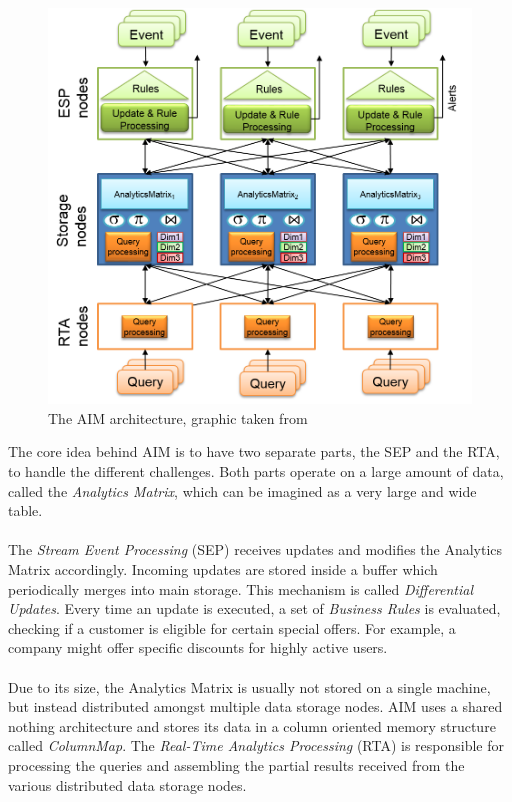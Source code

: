 \documentclass[11pt,singlecolumn]{scrartcl}
\begin{document}
\begin{figure}[h]
\includegraphics[scale=0.7]{layers.png}
\caption{The AIM architecture, graphic taken from \cite{aim}}
\end{figure}
\vspace{10mm}
The core idea behind AIM is to have two separate parts, the SEP and the RTA, to handle the different challenges.  Both parts operate on a large amount of data, called the \textit{Analytics Matrix}, which can be imagined as a very large and wide table. \\\\The \textit{Stream Event Processing} (SEP)  receives updates and modifies the Analytics Matrix accordingly. Incoming updates are stored inside a buffer which periodically merges into main storage. This mechanism is called \textit{Differential Updates}. Every time an update is executed, a set of \textit{Business Rules} is evaluated, checking if a customer is eligible for certain special offers. For example, a company might offer specific discounts for highly active users.\\\\ Due to its size, the Analytics Matrix is usually not stored on a single machine, but instead distributed amongst multiple data storage nodes. AIM uses a shared nothing architecture and stores its data in a column oriented memory structure called \textit{ColumnMap}. The \textit{Real-Time Analytics Processing} (RTA) is responsible for processing the queries and assembling the partial results received from the various distributed data storage nodes.
\end{document}
